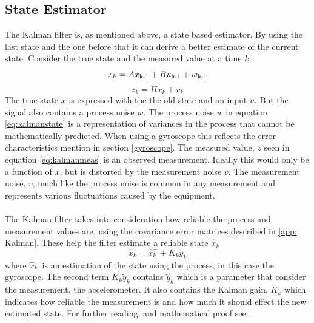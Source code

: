 \documentclass[a4paper,11pt]{kth-mag}
\begin{document}
\subsection{State Estimator}
The Kalman filter is, as mentioned above, a state based estimator. By using the last state and the one before that it can derive a better estimate of the current state. Consider the true state and the measured value at a time \textit{k}
\begin{equation}\label{eq:kalmanstate}
x_k = Ax\textsubscript{k-1}+Bu\textsubscript{k-1}+w\textsubscript{k-1}
\end{equation}
\begin{equation} \label{eq:kalmanmeas}
z_k = Hx_k + v_k
\end{equation}
The true state $x$ is expressed with the the old state and an input $u$. But the signal also contains a process noise $w$. The process noise $w$ in equation \eqref{eq:kalmanstate} is a representation of variances in the process that cannot be mathematically predicted. When using a gyroscope this reflects the error characteristics mention in section \ref{gyroscope}. 
The measured value, $z$ seen in equation \eqref{eq:kalmanmeas} is an observed measurement. Ideally this would only be a function of $x$, but is distorted by the measurement noise $v$.
The measurement noise, $v$, much like the process noise is common in any measurement and represents various fluctuations caused by the equipment.
\\ \\
The Kalman filter takes into consideration how reliable the  process and measurement values are, using the covariance error matrices described in \ref{app: Kalman}. These help the filter estimate a reliable state $\hat{x}_k$
\begin{equation}
\hat{x}_k = \hat{x}^-_k + K_k\tilde{y}_k
\end{equation}
where $\hat{x}^-_k$ is an estimation of the state using the process, in this case the gyroscope. The second term $K_k\tilde{y}_k$ contains $\tilde{y}_k$ which is a parameter that consider the measurement, the accelerometer. It also contains the Kalman gain, $K_k$ which indicates how reliable the measurement is and how much it should effect the new estimated state. For further reading, and mathematical proof see \cite{Kalmanintro}.
\end{document}
